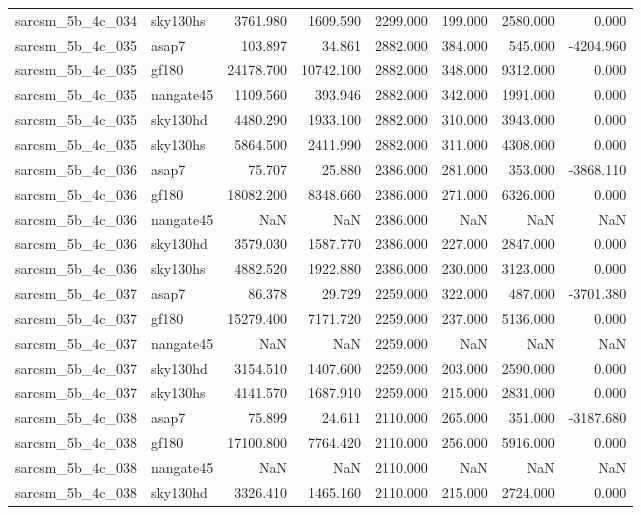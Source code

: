 \begin{tabular}{llrrrrrr}
sarcsm\_5b\_4c\_034 & sky130hs & 3761.980 & 1609.590 & 2299.000 & 199.000 & 2580.000 & 0.000 \\
sarcsm\_5b\_4c\_035 & asap7 & 103.897 & 34.861 & 2882.000 & 384.000 & 545.000 & -4204.960 \\
sarcsm\_5b\_4c\_035 & gf180 & 24178.700 & 10742.100 & 2882.000 & 348.000 & 9312.000 & 0.000 \\
sarcsm\_5b\_4c\_035 & nangate45 & 1109.560 & 393.946 & 2882.000 & 342.000 & 1991.000 & 0.000 \\
sarcsm\_5b\_4c\_035 & sky130hd & 4480.290 & 1933.100 & 2882.000 & 310.000 & 3943.000 & 0.000 \\
sarcsm\_5b\_4c\_035 & sky130hs & 5864.500 & 2411.990 & 2882.000 & 311.000 & 4308.000 & 0.000 \\
sarcsm\_5b\_4c\_036 & asap7 & 75.707 & 25.880 & 2386.000 & 281.000 & 353.000 & -3868.110 \\
sarcsm\_5b\_4c\_036 & gf180 & 18082.200 & 8348.660 & 2386.000 & 271.000 & 6326.000 & 0.000 \\
sarcsm\_5b\_4c\_036 & nangate45 & NaN & NaN & 2386.000 & NaN & NaN & NaN \\
sarcsm\_5b\_4c\_036 & sky130hd & 3579.030 & 1587.770 & 2386.000 & 227.000 & 2847.000 & 0.000 \\
sarcsm\_5b\_4c\_036 & sky130hs & 4882.520 & 1922.880 & 2386.000 & 230.000 & 3123.000 & 0.000 \\
sarcsm\_5b\_4c\_037 & asap7 & 86.378 & 29.729 & 2259.000 & 322.000 & 487.000 & -3701.380 \\
sarcsm\_5b\_4c\_037 & gf180 & 15279.400 & 7171.720 & 2259.000 & 237.000 & 5136.000 & 0.000 \\
sarcsm\_5b\_4c\_037 & nangate45 & NaN & NaN & 2259.000 & NaN & NaN & NaN \\
sarcsm\_5b\_4c\_037 & sky130hd & 3154.510 & 1407.600 & 2259.000 & 203.000 & 2590.000 & 0.000 \\
sarcsm\_5b\_4c\_037 & sky130hs & 4141.570 & 1687.910 & 2259.000 & 215.000 & 2831.000 & 0.000 \\
sarcsm\_5b\_4c\_038 & asap7 & 75.899 & 24.611 & 2110.000 & 265.000 & 351.000 & -3187.680 \\
sarcsm\_5b\_4c\_038 & gf180 & 17100.800 & 7764.420 & 2110.000 & 256.000 & 5916.000 & 0.000 \\
sarcsm\_5b\_4c\_038 & nangate45 & NaN & NaN & 2110.000 & NaN & NaN & NaN \\
sarcsm\_5b\_4c\_038 & sky130hd & 3326.410 & 1465.160 & 2110.000 & 215.000 & 2724.000 & 0.000 \\

\end{tabular}
